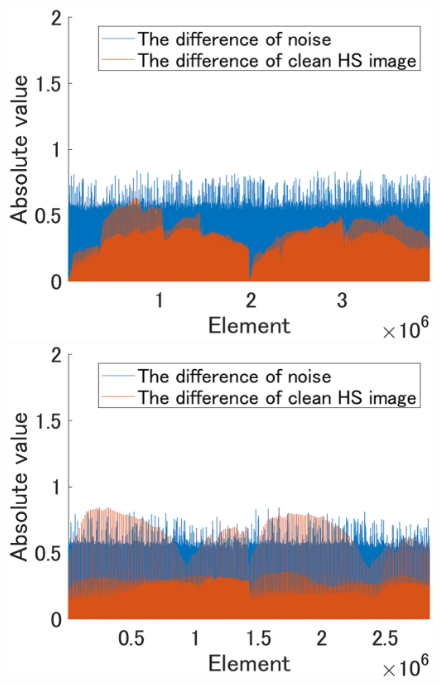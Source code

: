 \begin{figure}[t]
	\begin{center}
		\begin{minipage}{0.320\hsize}
			\centerline{\includegraphics[width=\hsize]{./fig_supplement/compare_sparsity/JasperRidge_first_order_differences.eps}}
		\end{minipage}
		\begin{minipage}{0.320\hsize}
			\centerline{\includegraphics[width=\hsize]{./fig_supplement/compare_sparsity/PaviaU120_first_order_differences.eps}}

\end{minipage}
\end{center}
\end{figure}
